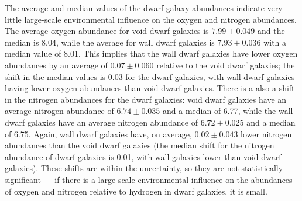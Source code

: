 The average and median values of the dwarf galaxy abundances indicate very 
little large-scale environmental influence on the oxygen and nitrogen 
abundances.  The average oxygen abundance for void dwarf galaxies is 
$7.99\pm 0.049$ and the median is 8.04, while the average for wall dwarf 
galaxies is $7.93\pm 0.036$ with a median value of 8.01.  This implies that the 
wall dwarf galaxies have lower oxygen abundances by an average of 
$0.07\pm 0.060$ relative to the void dwarf galaxies; the shift in the median 
values is 0.03 for the dwarf galaxies, with wall dwarf galaxies having lower 
oxygen abundances than void dwarf galaxies.  There is a also a shift in the 
nitrogen abundances for the dwarf galaxies: void dwarf galaxies have an average 
nitrogen abundance of $6.74\pm 0.035$ and a median of 6.77, while the wall dwarf 
galaxies have an average nitrogen abundance of $6.72\pm 0.025$ and a median of 
6.75.  Again, wall dwarf galaxies have, on average, $0.02\pm 0.043$ lower 
nitrogen abundances than the void dwarf galaxies (the median shift for the 
nitrogen abundance of dwarf galaxies is 0.01, with wall galaxies lower than void 
dwarf galaxies).  These shifts are within the uncertainty, so they are not 
statistically significant --- if there is a large-scale environmental influence 
on the abundances of oxygen and nitrogen relative to hydrogen in dwarf galaxies, 
it is small.


